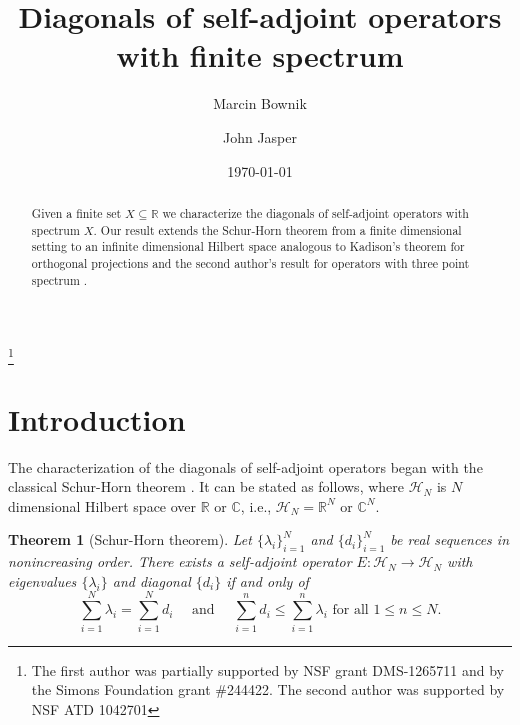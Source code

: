 \documentclass[12pt]{amsart}
\newcounter{Theorem}
\numberwithin{equation}{section}
\numberwithin{Theorem}{section}
\theoremstyle{plain}
\newtheorem{thm}[Theorem]{Theorem}
\theoremstyle{definition}
\theoremstyle{remark}
\begin{document}
\title{Diagonals of self-adjoint operators with finite spectrum}

\author{Marcin Bownik}
\address{Department of Mathematics, University of Oregon, Eugene, OR 97403--1222, USA}

\author{John Jasper}
\address{Department of Mathematics,
University of Missouri,
Columbia, MO 65211--4100, USA}


\thanks{
The first author was partially supported by NSF grant DMS-1265711 and by the Simons Foundation grant \#244422.
The second author was supported by NSF ATD 1042701}

\date{\today}

\begin{abstract}
 Given a finite set $X\subseteq{\mathbb{R}}$ we characterize the diagonals of self-adjoint operators with spectrum $X$. Our result extends the Schur-Horn theorem from a finite dimensional setting to an infinite dimensional Hilbert space analogous to Kadison's theorem for orthogonal projections \cite{k1,k2} and the second author's result for operators with three point spectrum \cite{jj}. 
\end{abstract}

\maketitle

\section{Introduction}

The characterization of the diagonals of self-adjoint operators began with the classical Schur-Horn theorem \cite{horn, schur}. It can be stated as follows, where $\mathcal H_N$ is $N$ dimensional Hilbert space over ${\mathbb{R}}$ or ${\mathbb{C}}$, i.e., $\mathcal H_N={\mathbb{R}}^N$ or ${\mathbb{C}}^N$.

\begin{thm}[Schur-Horn theorem]\label{horn} 
Let $\{\lambda_{i}\}_{i=1}^{N}$ and $\{d_{i}\}_{i=1}^{N}$ be real sequences in nonincreasing order. There exists a self-adjoint operator $E:\mathcal H_N \to\mathcal H_N$ with eigenvalues $\{\lambda_{i}\}$ and diagonal $\{d_{i}\}$
if and only of 
\begin{equation}\label{horn1}
\sum_{i=1}^{N}\lambda_{i} =\sum_{i=1}^{N}d_{i} \quad\text{ and }\quad \sum_{i=1}^{n}d_{i} \leq \sum_{i=1}^{n}\lambda_{i} \text{ for all } 1\le n \le N.
\end{equation}
\end{thm}
\end{document}
